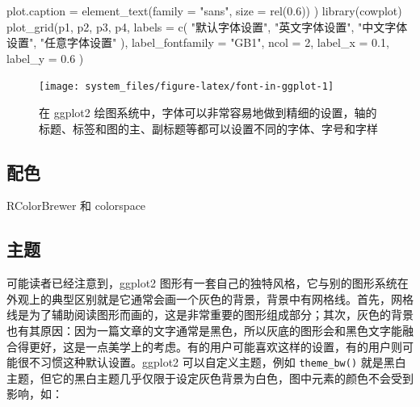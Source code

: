 \documentclass[
  b5paper,
  UTF8,twoside]{book}
\newenvironment{Shaded}{\begin{snugshade}}{\end{snugshade}}
\newcommand{\AttributeTok}[1]{\textcolor[rgb]{0.77,0.63,0.00}{#1}}
\newcommand{\DecValTok}[1]{\textcolor[rgb]{0.00,0.00,0.81}{#1}}
\newcommand{\FloatTok}[1]{\textcolor[rgb]{0.00,0.00,0.81}{#1}}
\newcommand{\FunctionTok}[1]{\textcolor[rgb]{0.00,0.00,0.00}{#1}}
\newcommand{\NormalTok}[1]{#1}
\newcommand{\StringTok}[1]{\textcolor[rgb]{0.31,0.60,0.02}{#1}}
\begin{document}
\begin{Shaded}
\begin{Highlighting}[]
    \AttributeTok{plot.caption =} \FunctionTok{element\_text}\NormalTok{(}\AttributeTok{family =} \StringTok{"sans"}\NormalTok{, }\AttributeTok{size =} \FunctionTok{rel}\NormalTok{(}\FloatTok{0.6}\NormalTok{))}
\NormalTok{  )}
\FunctionTok{library}\NormalTok{(cowplot)}
\FunctionTok{plot\_grid}\NormalTok{(p1, p2, p3, p4,}
  \AttributeTok{labels =} \FunctionTok{c}\NormalTok{(}
    \StringTok{"默认字体设置"}\NormalTok{, }\StringTok{"英文字体设置"}\NormalTok{,}
    \StringTok{"中文字体设置"}\NormalTok{, }\StringTok{"任意字体设置"}
\NormalTok{  ), }\AttributeTok{label\_fontfamily =} \StringTok{"GB1"}\NormalTok{, }\AttributeTok{ncol =} \DecValTok{2}\NormalTok{,}
  \AttributeTok{label\_x =} \FloatTok{0.1}\NormalTok{, }\AttributeTok{label\_y =} \FloatTok{0.6}
\NormalTok{)}
\end{Highlighting}
\end{Shaded}

\begin{figure}

{\centering \texttt{[image: system\_files/figure-latex/font-in-ggplot-1]} 

}

\caption[在 ggplot2 绘图系统中设置中英文字体]{在 ggplot2 绘图系统中，字体可以非常容易地做到精细的设置，轴的标题、标签和图的主、副标题等都可以设置不同的字体、字号和字样}\label{fig:font-in-ggplot}
\end{figure}





\hypertarget{subsec:color}{%
\subsection{配色}\label{subsec:color}}

RColorBrewer 和 colorspace

\hypertarget{subsec:theme}{%
\subsection{主题}\label{subsec:theme}}

可能读者已经注意到，ggplot2 图形有一套自己的独特风格，它与别的图形系统在外观上的典型区别就是它通常会画一个灰色的背景，背景中有网格线。首先，网格线是为了辅助阅读图形而画的，这是非常重要的图形组成部分；其次，灰色的背景也有其原因：因为一篇文章的文字通常是黑色，所以灰底的图形会和黑色文字能融合得更好，这是一点美学上的考虑。有的用户可能喜欢这样的设置，有的用户则可能很不习惯这种默认设置。ggplot2 可以自定义主题，例如 \texttt{theme\_bw()} 就是黑白主题，但它的黑白主题几乎仅限于设定灰色背景为白色，图中元素的颜色不会受到影响，如：
\end{document}
